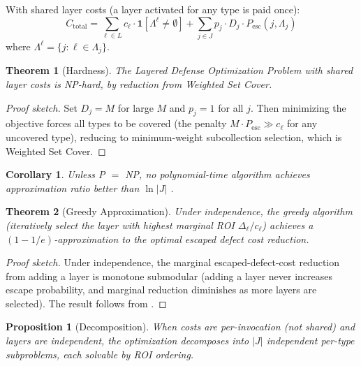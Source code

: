 \documentclass[11pt, a4paper, copyright]{googledeepmind}
\newtheorem{theorem}{Theorem}[section]
\newtheorem{proposition}{Proposition}[section]
\newtheorem{corollary}{Corollary}[section]
\newcommand{\Pesc}{P_{\mathrm{esc}}}
\begin{document}
With shared layer costs (a layer activated for any type is paid once):
\begin{equation}
\label{eq:objective}
C_{\mathrm{total}} = \sum_{\ell \in L} c_\ell \cdot \mathbf{1}[\Lambda^\ell \neq \emptyset] + \sum_{j \in J} p_j \cdot D_j \cdot \Pesc(j, \Lambda_j)
\end{equation}
where $\Lambda^\ell = \{j : \ell \in \Lambda_j\}$.

\begin{theorem}[Hardness]
\label{thm:nphard}
The Layered Defense Optimization Problem with shared layer costs is NP-hard, by reduction from Weighted Set Cover.
\end{theorem}

\begin{proof}[Proof sketch]
Set $D_j = M$ for large $M$ and $p_j = 1$ for all $j$. Then minimizing the objective forces all types to be covered (the penalty $M \cdot \Pesc \gg c_\ell$ for any uncovered type), reducing to minimum-weight subcollection selection, which is Weighted Set Cover.
\end{proof}

\begin{corollary}
\label{cor:inapprox}
Unless P $=$ NP, no polynomial-time algorithm achieves approximation ratio better than $\ln|J|$ \citep{dinur2014}.
\end{corollary}

\begin{theorem}[Greedy Approximation]
\label{thm:greedy}
Under independence, the greedy algorithm (iteratively select the layer with highest marginal ROI $\Delta_\ell / c_\ell$) achieves a $(1-1/e)$-approximation to the optimal escaped defect cost reduction.
\end{theorem}

\begin{proof}[Proof sketch]
Under independence, the marginal escaped-defect-cost reduction from adding a layer is monotone submodular (adding a layer never increases escape probability, and marginal reduction diminishes as more layers are selected). The result follows from \citet{nemhauser1978}.
\end{proof}

\begin{proposition}[Decomposition]
\label{prop:decomp}
When costs are per-invocation (not shared) and layers are independent, the optimization decomposes into $|J|$ independent per-type subproblems, each solvable by ROI ordering.
\end{proposition}
\end{document}

